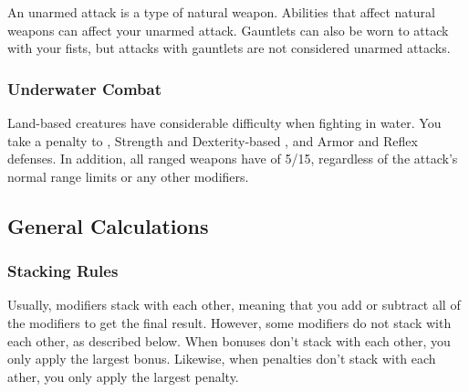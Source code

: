             An unarmed attack is a type of natural weapon.
            Abilities that affect natural weapons can affect your unarmed attack.
            Gauntlets can also be worn to attack with your fists, but attacks with gauntlets are not considered unarmed attacks.

        \subsubsection{Underwater Combat}\label{Underwater Combat}
            Land-based creatures have considerable difficulty when fighting in water.
            You take a  penalty to , Strength and Dexterity-based , and Armor and Reflex defenses.
            In addition, all ranged weapons have  of 5/15, regardless of the attack's normal range limits or any other modifiers.

    \subsection{General Calculations}

        \subsubsection{Stacking Rules}\label{Stacking Rules}
            Usually, modifiers stack with each other, meaning that you add or subtract all of the modifiers to get the final result.
            However, some modifiers do not stack with each other, as described below.
            When bonuses don't stack with each other, you only apply the largest bonus.
            Likewise, when penalties don't stack with each ather, you only apply the largest penalty.


